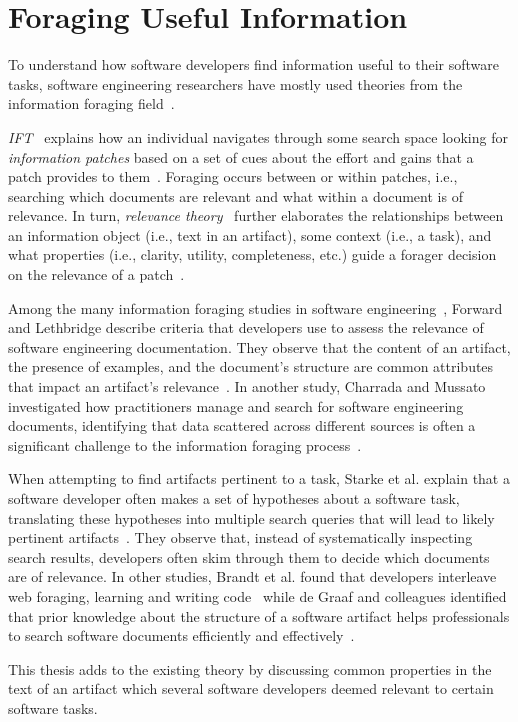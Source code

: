



\section{Foraging Useful Information}
\label{cp2:foraging}




To understand how software developers find  information useful to their software tasks,
software engineering researchers have mostly used theories from the information foraging
field~\cite{Pirolli1999}. 


\textit{\acf{IFT}}~\cite{Pirolli1999} explains how 
an individual navigates through some search space looking for \textit{information patches} based on 
a set of cues about the effort and gains that a patch provides to them~\cite{Pirolli1999}.
Foraging occurs between or within patches, i.e., 
searching which documents are relevant and what within a document is of relevance.
In turn, \textit{relevance theory}~\cite{clark2013relevance, saracevic1975} further elaborates the relationships between an information object (i.e., text in an artifact),
some context (i.e., a task), and what properties (i.e., clarity, utility, completeness, etc.) guide a forager decision 
on the relevance of a patch~\cite{Saracevic2007b, Saracevic2007c}. 



Among the many information foraging studies in software engineering~\cite{Piorkowski2015, Piorkowski2016, chi2007, Ko2006a},
 Forward and Lethbridge describe criteria that developers use to assess the relevance of software engineering documentation. They observe that the content of an artifact, the presence of examples, and the document's structure are common attributes that impact an artifact's relevance~\cite{Forward2002}.
In another study, Charrada and Mussato investigated how 
practitioners manage and search for software engineering documents, 
identifying that data scattered across different sources is 
often a significant challenge to the information foraging process~\cite{BenCharrada2016}.



When attempting to find artifacts pertinent to a task, 
Starke et al. explain that a software developer often makes a set of hypotheses about a software task,
translating these hypotheses into multiple search queries that will lead to  likely pertinent artifacts~\cite{Starke2009}. 
They observe that, instead of systematically inspecting search results,
developers often skim through them to decide which documents are of relevance. 
In other studies, Brandt et al. found that developers interleave web foraging, learning and writing code~\cite{Brandt2009a} while de Graaf and colleagues 
identified that prior knowledge about the structure of a software artifact helps professionals
to search software documents efficiently and effectively~\cite{DeGraaf2014}.


This thesis adds to the existing theory by discussing 
common properties in the text of an artifact which several software developers deemed relevant 
to certain software tasks.  
